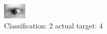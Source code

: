 \begin{figure}[h!]
\begin{center}
\includegraphics[width=0.60\columnwidth]{figures/ID722_class_2_target_4.png}
\end{center}
\caption{ Classification: 2 actual target: 4}
\label{fig:ID722_class_2_target_4}
\end{figure}
